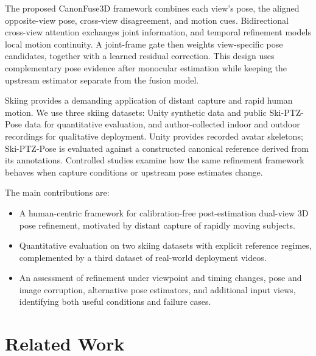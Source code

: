 \documentclass[preprint,12pt]{elsarticle}
\begin{document}
The proposed CanonFuse3D framework combines each view's pose, the aligned opposite-view pose, cross-view disagreement, and motion cues. Bidirectional cross-view attention exchanges joint information, and temporal refinement models local motion continuity. A joint-frame gate then weights view-specific pose candidates, together with a learned residual correction. This design uses complementary pose evidence after monocular estimation while keeping the upstream estimator separate from the fusion model.

Skiing provides a demanding application of distant capture and rapid human motion. We use three skiing datasets: Unity synthetic data and public Ski-PTZ-Pose data for quantitative evaluation, and author-collected indoor and outdoor recordings for qualitative deployment. Unity provides recorded avatar skeletons; Ski-PTZ-Pose is evaluated against a constructed canonical reference derived from its annotations. Controlled studies examine how the same refinement framework behaves when capture conditions or upstream pose estimates change.

The main contributions are:
\begin{itemize}
    \item A human-centric framework for calibration-free post-estimation dual-view 3D pose refinement, motivated by distant capture of rapidly moving subjects.
    \item Quantitative evaluation on two skiing datasets with explicit reference regimes, complemented by a third dataset of real-world deployment videos.
    \item An assessment of refinement under viewpoint and timing changes, pose and image corruption, alternative pose estimators, and additional input views, identifying both useful conditions and failure cases.
\end{itemize}

\section{Related Work}
\label{sec:related_work}
\end{document}
